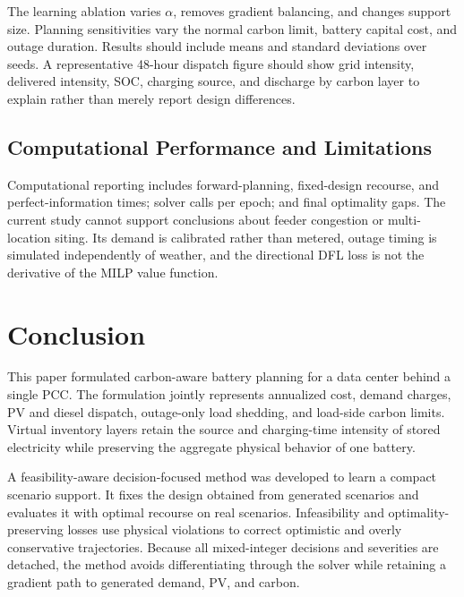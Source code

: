 \documentclass[times]{elsarticle}
\begin{document}

The learning ablation varies $\alpha$, removes gradient balancing, and changes
support size. Planning sensitivities vary the normal carbon limit, battery
capital cost, and outage duration. Results should include means and standard
deviations over seeds. A representative 48-hour dispatch figure should show
grid intensity, delivered intensity, SOC, charging source, and discharge by
carbon layer to explain rather than merely report design differences.

\subsection{Computational Performance and Limitations}

Computational reporting includes forward-planning, fixed-design recourse, and
perfect-information times; solver calls per epoch; and final optimality gaps.
The current study cannot support conclusions about feeder congestion or
multi-location siting. Its demand is calibrated rather than metered, outage
timing is simulated independently of weather, and the directional DFL loss is
not the derivative of the MILP value function.

\section{Conclusion}
\label{sec:conclusion}

This paper formulated carbon-aware battery planning for a data center behind a
single PCC. The formulation jointly represents annualized cost, demand charges,
PV and diesel dispatch, outage-only load shedding, and load-side carbon limits.
Virtual inventory layers retain the source and charging-time intensity of
stored electricity while preserving the aggregate physical behavior of one
battery.

A feasibility-aware decision-focused method was developed to learn a compact
scenario support. It fixes the design obtained from generated scenarios and
evaluates it with optimal recourse on real scenarios. Infeasibility and
optimality-preserving losses use physical violations to correct optimistic and
overly conservative trajectories. Because all mixed-integer decisions and
severities are detached, the method avoids differentiating through the solver
while retaining a gradient path to generated demand, PV, and carbon.
\end{document}
